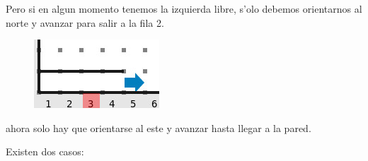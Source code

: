 \documentclass{article}
\begin{document}
    Pero si en algun momento tenemos la izquierda libre, s'olo debemos orientarnos al norte y avanzar para salir
    a la fila 2.

    \begin{figure}[H]
        \centering
        \includegraphics[scale = 0.5]{izquierda_libre}
    \end{figure}

    ahora solo hay que orientarse al este y avanzar hasta llegar a la pared. 

    \hfill \break
    \hfill \break
    \hfill \break
    \hfill \break
    \hfill \break
    \hfill \break
    \hfill \break

    Existen dos casos:
\end{document}
